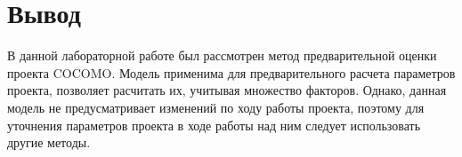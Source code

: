 \chapter*{Вывод}

В данной лабораторной работе был рассмотрен метод предварительной оценки проекта COCOMO. Модель применима для предварительного расчета параметров проекта, позволяет расчитать их, учитывая множество факторов. Однако, данная модель не предусматривает изменений по ходу работы проекта, поэтому для уточнения параметров проекта в ходе работы над ним следует использовать другие методы.